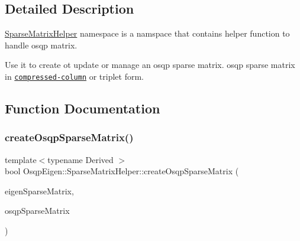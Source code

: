 

\subsection{Detailed Description}
\mbox{\hyperlink{namespaceOsqpEigen_1_1SparseMatrixHelper}{Sparse\+Matrix\+Helper}} namespace is a namspace that contains helper function to handle osqp matrix. 

Use it to create ot update or manage an osqp sparse matrix. osqp sparse matrix in \href{https://people.sc.fsu.edu/~jburkardt/data/cc/cc.html}{\tt compressed-\/column} or triplet form. 

\subsection{Function Documentation}
\mbox{\label{namespaceOsqpEigen_1_1SparseMatrixHelper_a84479192d86e344f029d072a62c8217b}} 
\subsubsection{\texorpdfstring{create\+Osqp\+Sparse\+Matrix()}{createOsqpSparseMatrix()}}
{\footnotesize\ttfamily template$<$typename Derived $>$ \\
bool Osqp\+Eigen\+::\+Sparse\+Matrix\+Helper\+::create\+Osqp\+Sparse\+Matrix (\begin{DoxyParamCaption}\item[{const Eigen\+::\+Sparse\+Compressed\+Base$<$ Derived $>$ \&}]{eigen\+Sparse\+Matrix,  }\item[{csc $\ast$\&}]{osqp\+Sparse\+Matrix }\end{DoxyParamCaption})}



